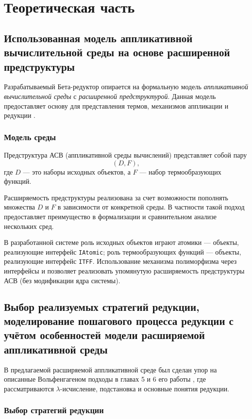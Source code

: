 \chapter{Теоретическая часть}
\section{Использованная модель аппликативной вычислительной среды на основе расширенной предструктуры}
\label{sec:extended-prestructure}

Разрабатываемый Бета-редуктор опирается на формальную модель \textit{аппликативной вычислительной среды} с \emph{расширенной предструктурой}.
Данная модель предоставляет основу для представления термов, механизмов аппликации и редукции \cite{Roslovtsev2011}.

\subsection*{Модель среды}
Предструктура АСВ (аппликативной среды вычислений) представляет собой пару 
$$ (D, F), $$
где $D$ --- это наборы исходных объектов, а $F$ --- набор термообразующих функций.

Расширяемость предструктуры реализована за счет возможности пополнять множества $D$ и $F$
в зависимости от конкретной среды.
В частности такой подход предоставляет преимущество в формализации и сравнительном анализе нескольких сред.

В разработанной системе роль исходных объектов играют атомики --- объекты, реализующие интерфейс \texttt{IAtomic};
роль термообразующих функций --- объекты, реализующие интерфейс \texttt{ITFF}.
Использование механизма полиморфизма через интерфейсы и позволяет реализовать упомянутую расширяемость предструктуры АСВ
(без модификации ядра системы).

\section{Выбор реализуемых стратегий редукции, моделирование пошагового процесса редукции с учётом особенностей модели расширяемой аппликативной среды}
\label{sec:reduction-strategies}

В предлагаемой расширяемой аппликативной среде был сделан упор на описанные Вольфенгагеном подходы в главах 5 и 6 его работы \cite{Wolfengagen2004}, где рассматриваются $\lambda$-исчисление, подстановка и основные понятия редукции.

\subsection{Выбор стратегий редукции}

